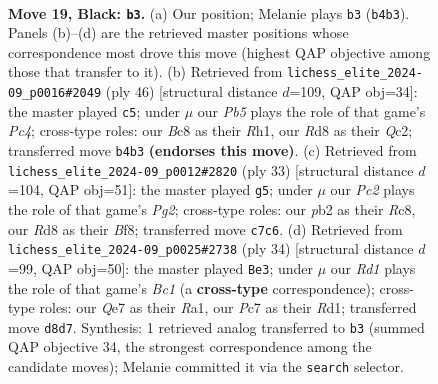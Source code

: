 \documentclass[11pt]{article}
\begin{document}
\clearpage

\begin{figure}[p]\centering
\begin{subfigure}{0.46\textwidth}\centering
\resizebox{\linewidth}{!}{%
\newchessgame
\chessboard[
  setfen={1rbrn1k1/p1p1qp2/6p1/n1PpP2p/Qp1N4/4P1P1/PP1B1P1P/2K1RBR1 b - - 3 19},
  showmover=false,
  pgfstyle=straightmove, color=movearrow, markmove={b4-b3}
]}
\caption{}
\end{subfigure}\hfill
\begin{subfigure}{0.46\textwidth}\centering
\resizebox{\linewidth}{!}{%
\newchessgame
\chessboard[
  setfen={r3r1k1/p2b1pb1/qppP2p1/5p1p/N1P2P1P/P2R1BP1/1PQ5/2K4R w - - 0 24},
  showmover=false,
  pgfstyle=straightmove, color=movearrow, markmove={c4-c5}
]}
\caption{}
\end{subfigure}
\\[4pt]
\begin{subfigure}{0.46\textwidth}\centering
\resizebox{\linewidth}{!}{%
\newchessgame
\chessboard[
  setfen={2rk1b1r/pp4pp/1q3p2/n4p2/Q1pPp3/2P1B2P/PP2BPP1/1R2K2R b K - 1 17},
  showmover=false,
  pgfstyle=straightmove, color=movearrow, markmove={g7-g5}
]}
\caption{}
\end{subfigure}\hfill
\begin{subfigure}{0.46\textwidth}\centering
\resizebox{\linewidth}{!}{%
\newchessgame
\chessboard[
  setfen={1r1b1rk1/1p3pp1/pNqpbn1p/P3p3/4P3/1PNQ4/2P2PPP/R1BR2K1 w - - 3 18},
  showmover=false,
  pgfstyle=straightmove, color=movearrow, markmove={c1-e3}
]}
\caption{}
\end{subfigure}
\caption{\textbf{Move 19, Black: \texttt{b3}.} (a) Our position; Melanie plays \texttt{b3} (\texttt{b4b3}). Panels (b)--(d) are the retrieved master positions whose correspondence most drove this move (highest QAP objective among those that transfer to it). (b) Retrieved from \texttt{lichess\_elite\_2024-09\_p0016\#2049} (ply 46) [structural distance $d$=109, QAP obj=34]: the master played \texttt{c5}; under $\mu$ our \emph{Pb5} plays the role of that game's \emph{Pc4}; cross-type roles: our \emph{B}c8 as their \emph{R}h1, our \emph{R}d8 as their \emph{Q}c2; transferred move \texttt{b4b3} \textbf{(endorses this move)}. (c) Retrieved from \texttt{lichess\_elite\_2024-09\_p0012\#2820} (ply 33) [structural distance $d$=104, QAP obj=51]: the master played \texttt{g5}; under $\mu$ our \emph{Pc2} plays the role of that game's \emph{Pg2}; cross-type roles: our \emph{p}b2 as their \emph{R}c8, our \emph{R}d8 as their \emph{B}f8; transferred move \texttt{c7c6}. (d) Retrieved from \texttt{lichess\_elite\_2024-09\_p0025\#2738} (ply 34) [structural distance $d$=99, QAP obj=50]: the master played \texttt{Be3}; under $\mu$ our \emph{Rd1} plays the role of that game's \emph{Bc1} (a \textbf{cross-type} correspondence); cross-type roles: our \emph{Q}e7 as their \emph{R}a1, our \emph{P}c7 as their \emph{R}d1; transferred move \texttt{d8d7}. Synthesis: 1 retrieved analog transferred to \texttt{b3} (summed QAP objective 34, the strongest correspondence among the candidate moves); Melanie committed it via the \texttt{search} selector.}
\label{fig:thought-m37}
\end{figure}
\end{document}

